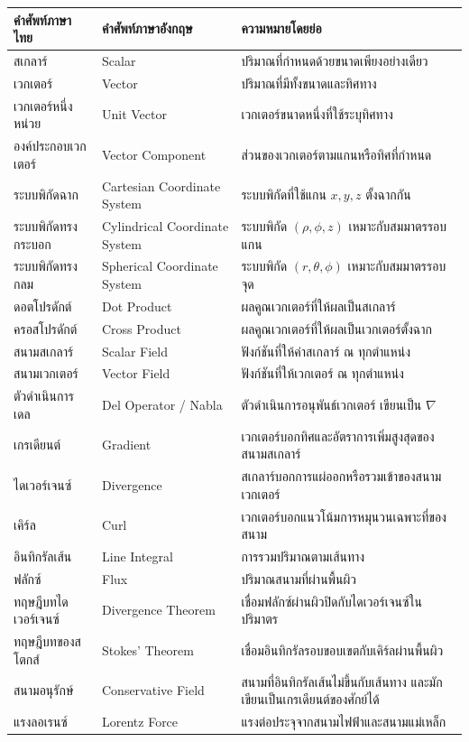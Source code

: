 \begin{table}[htbp]
    \centering
    \begin{tabularx}{\textwidth}{L{0.22\textwidth} L{0.25\textwidth} Y}
        \hline
        \textbf{คำศัพท์ภาษาไทย} & \textbf{คำศัพท์ภาษาอังกฤษ} & \textbf{ความหมายโดยย่อ} \\
        \hline
        สเกลาร์ & Scalar & ปริมาณที่กำหนดด้วยขนาดเพียงอย่างเดียว \\
        เวกเตอร์ & Vector & ปริมาณที่มีทั้งขนาดและทิศทาง \\
        เวกเตอร์หนึ่งหน่วย & Unit Vector & เวกเตอร์ขนาดหนึ่งที่ใช้ระบุทิศทาง \\
        องค์ประกอบเวกเตอร์ & Vector Component & ส่วนของเวกเตอร์ตามแกนหรือทิศที่กำหนด \\
        ระบบพิกัดฉาก & Cartesian Coordinate System & ระบบพิกัดที่ใช้แกน \(x,y,z\) ตั้งฉากกัน \\
        ระบบพิกัดทรงกระบอก & Cylindrical Coordinate System & ระบบพิกัด \((\rho,\phi,z)\) เหมาะกับสมมาตรรอบแกน \\
        ระบบพิกัดทรงกลม & Spherical Coordinate System & ระบบพิกัด \((r,\theta,\phi)\) เหมาะกับสมมาตรรอบจุด \\
        ดอตโปรดักต์ & Dot Product & ผลคูณเวกเตอร์ที่ให้ผลเป็นสเกลาร์ \\
        ครอสโปรดักต์ & Cross Product & ผลคูณเวกเตอร์ที่ให้ผลเป็นเวกเตอร์ตั้งฉาก \\
        สนามสเกลาร์ & Scalar Field & ฟังก์ชันที่ให้ค่าสเกลาร์ ณ ทุกตำแหน่ง \\
        สนามเวกเตอร์ & Vector Field & ฟังก์ชันที่ให้เวกเตอร์ ณ ทุกตำแหน่ง \\
        ตัวดำเนินการเดล & Del Operator / Nabla & ตัวดำเนินการอนุพันธ์เวกเตอร์ เขียนเป็น \(\nabla\) \\
        เกรเดียนต์ & Gradient & เวกเตอร์บอกทิศและอัตราการเพิ่มสูงสุดของสนามสเกลาร์ \\
        ไดเวอร์เจนซ์ & Divergence & สเกลาร์บอกการแผ่ออกหรือรวมเข้าของสนามเวกเตอร์ \\
        เคิร์ล & Curl & เวกเตอร์บอกแนวโน้มการหมุนวนเฉพาะที่ของสนาม \\
        อินทิกรัลเส้น & Line Integral & การรวมปริมาณตามเส้นทาง \\
        ฟลักซ์ & Flux & ปริมาณสนามที่ผ่านพื้นผิว \\
        ทฤษฎีบทไดเวอร์เจนซ์ & Divergence Theorem & เชื่อมฟลักซ์ผ่านผิวปิดกับไดเวอร์เจนซ์ในปริมาตร \\
        ทฤษฎีบทของสโตกส์ & Stokes' Theorem & เชื่อมอินทิกรัลรอบขอบเขตกับเคิร์ลผ่านพื้นผิว \\
        สนามอนุรักษ์ & Conservative Field & สนามที่อินทิกรัลเส้นไม่ขึ้นกับเส้นทาง และมักเขียนเป็นเกรเดียนต์ของศักย์ได้ \\
        แรงลอเรนซ์ & Lorentz Force & แรงต่อประจุจากสนามไฟฟ้าและสนามแม่เหล็ก \\
        \hline
    \end{tabularx}
\end{table}


